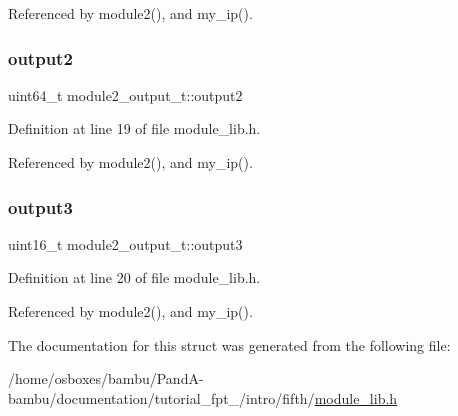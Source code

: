 Referenced by module2(), and my\+\_\+ip().

\mbox{\label{structmodule2__output__t_aa628fc0a1b293f0abfd3abd9e4351028}} 
\subsubsection{\texorpdfstring{output2}{output2}}
{\footnotesize\ttfamily uint64\+\_\+t module2\+\_\+output\+\_\+t\+::output2}



Definition at line 19 of file module\+\_\+lib.\+h.



Referenced by module2(), and my\+\_\+ip().

\mbox{\label{structmodule2__output__t_a883efd615406bacb023c91515697b061}} 
\subsubsection{\texorpdfstring{output3}{output3}}
{\footnotesize\ttfamily uint16\+\_\+t module2\+\_\+output\+\_\+t\+::output3}



Definition at line 20 of file module\+\_\+lib.\+h.



Referenced by module2(), and my\+\_\+ip().



The documentation for this struct was generated from the following file\+:\begin{DoxyCompactItemize}
\item 
/home/osboxes/bambu/\+Pand\+A-\/bambu/documentation/tutorial\+\_\+fpt\+\_/intro/fifth/\hyperlink{tutorial__fpt__2017_2intro_2fifth_2module__lib_8h}{module\+\_\+lib.\+h}\end{DoxyCompactItemize}
